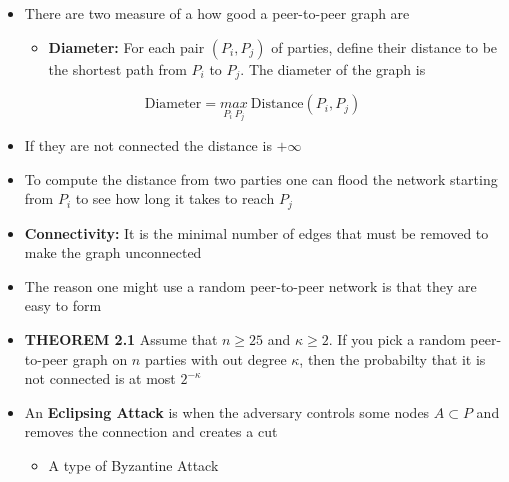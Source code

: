 \documentclass[11pt]{article}
\begin{document}
\begin{itemize}
\item There are two measure of a how good a peer-to-peer graph are
\begin{itemize}
\item \textbf{Diameter:} For each pair \((P_i, P_j)\) of parties, define their distance to be the shortest path from \(P_i\) to \(P_j\). The diameter of the graph is
\end{itemize}
\end{itemize}
\begin{equation} \text{Diameter} = \underset{P_i \ P_j}{max}\ \text{Distance}(P_i, P_j) \end{equation}
\begin{itemize}
\item If they are not connected the distance is \(+\infty\)
\item To compute the distance from two parties one can flood the network starting from \(P_i\) to see how long it takes to reach \(P_j\)
\end{itemize}
\begin{itemize}
\item \textbf{Connectivity:} It is the minimal number of edges that must be removed to make the graph unconnected
\end{itemize}
\begin{itemize}
\item The reason one might use a random peer-to-peer network is that they are easy to form

\item \textbf{THEOREM 2.1} Assume that \(n \geq 25\) and \(\kappa \geq 2\). If you pick a random peer-to-peer graph on \(n\) parties with out degree \(\kappa\), then the probabilty that it is not connected is at most \(2^{-\kappa}\)

\item An \textbf{Eclipsing Attack} is when the adversary controls some nodes \(A \subset P\) and removes the connection and creates a cut 
\begin{itemize}
\item A type of Byzantine Attack
\end{itemize}
\end{itemize}
\end{document}
